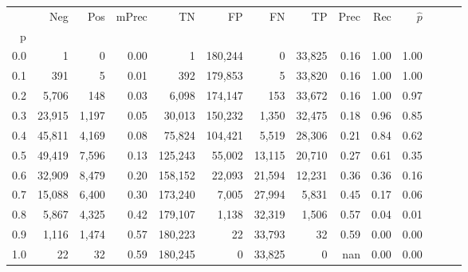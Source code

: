 \begin{tabular}{rrrrrrrrrrrrrr}
\toprule
{} &     Neg &    Pos & mPrec &       TN &       FP &      FN &      TP &  Prec &   Rec & $\hat{p}$ \\
p   &         &        &       &          &          &         &         &       &       &           \\
\midrule
0.0 &       1 &      0 &  0.00 &        1 &  180,244 &       0 &  33,825 &  0.16 &  1.00 &      1.00 \\
0.1 &     391 &      5 &  0.01 &      392 &  179,853 &       5 &  33,820 &  0.16 &  1.00 &      1.00 \\
0.2 &   5,706 &    148 &  0.03 &    6,098 &  174,147 &     153 &  33,672 &  0.16 &  1.00 &      0.97 \\
0.3 &  23,915 &  1,197 &  0.05 &   30,013 &  150,232 &   1,350 &  32,475 &  0.18 &  0.96 &      0.85 \\
0.4 &  45,811 &  4,169 &  0.08 &   75,824 &  104,421 &   5,519 &  28,306 &  0.21 &  0.84 &      0.62 \\
0.5 &  49,419 &  7,596 &  0.13 &  125,243 &   55,002 &  13,115 &  20,710 &  0.27 &  0.61 &      0.35 \\
0.6 &  32,909 &  8,479 &  0.20 &  158,152 &   22,093 &  21,594 &  12,231 &  0.36 &  0.36 &      0.16 \\
0.7 &  15,088 &  6,400 &  0.30 &  173,240 &    7,005 &  27,994 &   5,831 &  0.45 &  0.17 &      0.06 \\
0.8 &   5,867 &  4,325 &  0.42 &  179,107 &    1,138 &  32,319 &   1,506 &  0.57 &  0.04 &      0.01 \\
0.9 &   1,116 &  1,474 &  0.57 &  180,223 &       22 &  33,793 &      32 &  0.59 &  0.00 &      0.00 \\
1.0 &      22 &     32 &  0.59 &  180,245 &        0 &  33,825 &       0 &   nan &  0.00 &      0.00 \\
\bottomrule
\end{tabular}
